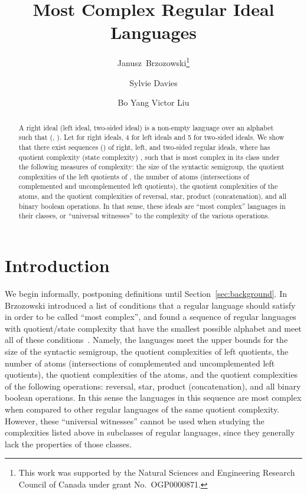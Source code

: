 \documentclass[final]{dmtcs-episciences}
\title{Most Complex Regular Ideal Languages}
\author{Janusz~Brzozowski\affiliationmark{1}\thanks{This work was supported by the Natural Sciences and Engineering Research Council of Canada under grant No.~OGP0000871.}
\and Sylvie Davies\affiliationmark{2} \and Bo Yang Victor Liu\affiliationmark{1}}
\affiliation{David R. Cheriton School of Computer Science, University of Waterloo \\
Department of Pure Mathematics, University of Waterloo}
\theoremstyle{definition}
\theoremstyle{remark}
\begin{document}

\maketitle
\begin{abstract}
A right ideal (left ideal, two-sided ideal) is a non-empty language  over an alphabet  
such that
 (, ).
Let  for right ideals, 4 for left ideals and 5 for two-sided ideals.
We show that there exist sequences () of  right, left, and two-sided regular ideals, where  has quotient complexity (state complexity) , such that 
 is most complex in its class under the following measures of complexity: 
the size of the syntactic semigroup,
the quotient complexities of the left quotients of ,  
the number of atoms (intersections of complemented and uncomplemented left quotients), 
the quotient complexities of the atoms,  
and the quotient complexities  of 
reversal, 
star,  
product (concatenation), 
and all binary boolean operations.
In that sense, these ideals are ``most complex'' languages in their classes, or ``universal witnesses'' to the complexity of the various operations.
\end{abstract}



\section{Introduction}
\label{sec:introduction}

We begin informally, postponing definitions until Section~\ref{sec:background}.
In~\cite{Brz13} Brzozowski introduced a list of conditions that a regular language should satisfy in order to be called ``most  complex'', and found a sequence  of  regular languages with quotient/state complexity  that have the smallest possible alphabet and meet all of these conditions~\cite{Brz13}.
Namely, the languages  meet the upper bounds for 
the size of the syntactic semigroup,
the quotient complexities of left quotients,
the number of atoms (intersections of complemented and uncomplemented left quotients),
the quotient complexities of the atoms, 
and the quotient complexities of  the following operations:
reversal, 
star, 
product (concatenation), 
and all binary boolean operations.
In this sense the languages in this sequence are most complex when compared to other regular languages of the same quotient complexity.
However, these  ``universal witnesses''
cannot be used when studying the complexities listed above in subclasses of regular languages, since they generally lack the properties of those classes.
\end{document}
